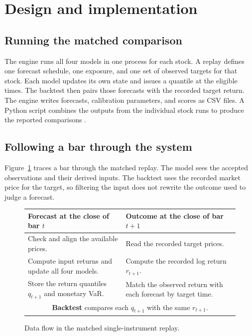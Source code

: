 \documentclass[
	12pt,				%
	openright,			%
	twoside,			%
	a4paper,
	chapter=TITLE,
	english				%
	]{abntex2}
\begin{document}
\section{Design and implementation}
\label{sec:design-implementation}

\subsection{Running the matched comparison}

The engine runs all four models in one process for each stock. A replay defines one forecast schedule, one exposure, and one set of observed targets for that stock. Each model updates its own state and issues a quantile at the eligible times. The backtest then pairs those forecasts with the recorded target return. The engine writes forecasts, calibration parameters, and scores as CSV files. A Python script combines the outputs from the individual stock runs to produce the reported comparisons \cite{project-comparison}.

\subsection{Following a bar through the system}

Figure~\ref{fig:arquitetura-modulos} traces a bar through the matched replay. The model sees the accepted observations and their derived inputs. The backtest uses the recorded market price for the target, so filtering the input does not rewrite the outcome used to judge a forecast.

\begin{figure}[htbp]
\centering
\caption{Data flow in the matched single-instrument replay.}
\label{fig:arquitetura-modulos}
\begin{tabular}{@{}p{}p{}@{}}
\toprule
\textbf{Forecast at the close of bar $t$} &
\textbf{Outcome at the close of bar $t+1$} \\
\midrule
Check and align the available prices. &
Read the recorded target prices. \\[2pt]
Compute input returns and update all four models. &
Compute the recorded log return $r_{t+1}$. \\[2pt]
Store the return quantiles $q_{t+1}$ and monetary VaR. &
Match the observed return with each forecast by target time. \\
\midrule
\multicolumn{2}{c}{\textbf{Backtest} compares each $q_{t+1}$ with the same $r_{t+1}$.} \\
\bottomrule
\end{tabular}
\end{figure}
\end{document}
